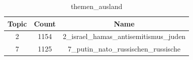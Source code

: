 \begin{table}
\caption{themen_ausland}
\label{tab:themen_ausland}
\begin{tabular}{ccc}
\toprule
Topic & Count & Name \\
\midrule
2 & 1154 & 2_israel_hamas_antisemitismus_juden \\
7 & 1125 & 7_putin_nato_russischen_russische \\
\bottomrule
\end{tabular}
\end{table}
